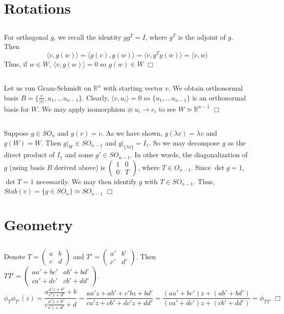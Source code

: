 \documentclass{article}
\begin{document}
\section{Rotations}
\subsection{}
For orthogonal $g$, we recall the identity $gg^T = I$, where $g^T$ is the adjoint of $g$. Then
$$\langle v,g(w) \rangle = \langle g(v), g(w) \rangle = \langle v, g^Tg(w) \rangle = \langle v,w \rangle$$
Thus, if $w \in W$, $\langle v, g(w) \rangle = 0$ so $g(w) \in W$ $\Box$
\subsection{}
Let us run Gram-Schmidt on $\mathbb{R}^n$ with starting vector $v$. We obtain orthonormal basis $B = \{\frac{v}{|v|}, u_1, \dots u_{n-1}\}$. Clearly, $\langle v, u_i \rangle = 0$ so $\{u_1, \dots u_{n-1}\}$ is an orthonormal basis for $W$. We may apply isomorphism $\phi: u_i \rightarrow e_i$ to see $W \simeq \mathbb{R}^{n-1}$ $\Box$
\subsection{}
Suppose $g \in SO_n$ and $g(v) = v$. As we have shown, $g(\lambda v) = \lambda v$ and $g(W) = W$. Then $g\vert_W \in SO_{n-1}$ and $g\vert_{\{\lambda v\}} = I_1$. So we may decompose $g$ as the direct product of $I_1$ and some $g' \in SO_{n-1}$. In other words, the diagonalization of $g$ (using basis $B$ derived above) is $\left(\begin{matrix}1&0\\0&T\end{matrix}\right)$, where $T \in O_{n-1}$. Since $\det g = 1$, $\det T = 1$ necessarily. We may then identify $g$ with $T \in SO_{n-1}$. Thus, $Stab(v) = \{g \in SO_n\} \simeq SO_{n-1}$ $\Box$

\section{Geometry}
\subsection{}
Denote $T = \left(\begin{matrix}a&b\\c&d\end{matrix}\right)$ and $T' = \left(\begin{matrix}a'&b'\\c'&d'\end{matrix}\right)$. Then $TT' = \left(\begin{matrix}aa'+bc'&ab'+bd'\\ca'+dc'&cb'+dd'\end{matrix}\right)$.
$$\phi_T\phi_{T'}(z) = \frac{a\frac{a'z+b'}{c'z+d'}+b}{c\frac{a'z+b'}{c'z+d'}+d} = \frac{aa'z + ab' + c'bz+bd'}{ca'z+cb'+dc'z+dd'} = \frac{(aa'+bc')z+(ab'+bd')}{(ca'+dc')z+(cb'+dd')} = \phi_{TT'} \; \Box$$
\end{document}
